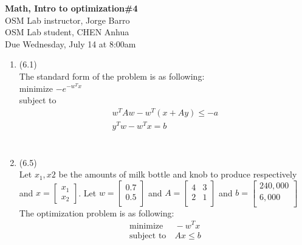 \documentclass[letterpaper,12pt]{article}
\theoremstyle{definition}
\begin{document}
\begin{flushleft}
   \textbf{\large{Math, Intro to optimization\#4}} \\[5pt]
   OSM Lab instructor, Jorge Barro\\[5pt]
   OSM Lab student, CHEN Anhua\\[5pt]
   Due Wednesday, July 14 at 8:00am
\end{flushleft}

\vspace{5mm}


\begin{enumerate}
	\item(6.1)\\
	The standard form of the problem is as following:\\
	minimize  $-e^{-w^{T}x}$\\
	subject to \begin{equation} \label{eq1}
			\begin{split}
			 w^{T}Aw - w^{T}(x + Ay) \leq -a\\
			 y^{T}w - w^{T}x = b\\
			\end{split}
		      \end{equation}\\

	\item(6.5)\\
	Let $x_{1}, x{2}$ be the amounts of milk bottle and knob to produce respectively and 
	$x = \begin{bmatrix}
	   x_{1}\\
	   x_{2}
	\end{bmatrix} $. Let $w =\begin{bmatrix} 0.7 \\ 0.5 \\ \end{bmatrix} $ and $A =  \begin{bmatrix} 4 & 3 \\ 2 & 1 \\ \end{bmatrix}$ and $b =  \begin{bmatrix} 240,000 \\ 6,000 \\ \end{bmatrix}$The optimization problem is as following:
	\begin{equation} \label{eq2}
			\begin{split}
			\text{minimize}   & \:  -w^{T}x\\
			\text{subject to}& \:  Ax \leq b\\
			\end{split}
	 \end{equation}\\
			 

\end{enumerate}
\end{document}
